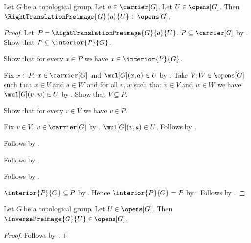 \begin{theorem}\label{right_translation_preimage_open}
    Let $G$ be a topological group.
    Let $a\in\carrier[G]$.
    Let $U\in\opens[G]$.
    Then $\RightTranslationPreimage{G}{a}{U}\in\opens[G]$.
\end{theorem}
\begin{proof}
    Let $P=\RightTranslationPreimage{G}{a}{U}$.
    $P\subseteq\carrier[G]$ by .
    Show that $P\subseteq\interior{P}{G}$.
    \begin{subproof}
        Show that for every $x\in P$ we have $x\in\interior{P}{G}$.
        \begin{subproof}
            Fix $x\in P$.
            $x\in\carrier[G]$ and $\mul[G](x,a)\in U$
                by .
            Take $V,W\in\opens[G]$ such that $x\in V$ and $a\in W$
                and for all $v,w$ such that $v\in V$ and $w\in W$
                we have $\mul[G](v,w)\in U$
                by .
            Show that $V\subseteq P$.
            \begin{subproof}
                Show that for every $v\in V$ we have $v\in P$.
                \begin{subproof}
                    Fix $v\in V$.
                    $v\in\carrier[G]$
                        by .
                    $\mul[G](v,a)\in U$.
                    Follows by .
                \end{subproof}
                Follows by .
            \end{subproof}
            Follows by .
        \end{subproof}
        Follows by .
    \end{subproof}
    $\interior{P}{G}\subseteq P$ by .
    Hence $\interior{P}{G}=P$ by .
    Follows by
        .
\end{proof}

\begin{corollary}\label{inverse_preimage_open}
    Let $G$ be a topological group.
    Let $U\in\opens[G]$.
    Then $\InversePreimage{G}{U}\in\opens[G]$.
\end{corollary}
\begin{proof}
    Follows by .
\end{proof}

